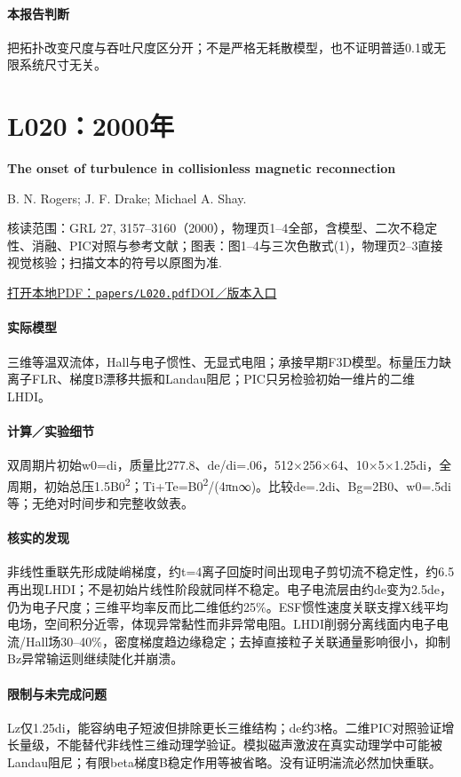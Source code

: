 \paragraph{本报告判断}把拓扑改变尺度与吞吐尺度区分开；不是严格无耗散模型，也不证明普适0.1或无限系统尺寸无关。

\section{L020：2000年}\label{paper:L020}

\textbf{The onset of turbulence in collisionless magnetic reconnection}\citep{L020}\

B. N. Rogers;  J. F. Drake;  Michael A. Shay.

\textsf{核读范围：}GRL 27, 3157–3160（2000），物理页1–4全部，含模型、二次不稳定性、消融、PIC对照与参考文献；\textsf{图表：}图1–4与三次色散式(1)，物理页2–3直接视觉核验；扫描文本的符号以原图为准.

\href{run:papers/L020.pdf}{打开本地PDF：\texttt{papers/L020.pdf}}\quad\href{https://doi.org/10.1029/2000gl000038}{DOI／版本入口}

\paragraph{实际模型}三维等温双流体，Hall与电子惯性、无显式电阻；承接早期F3D模型。标量压力缺离子FLR、梯度B漂移共振和Landau阻尼；PIC只另检验初始一维片的二维LHDI。

\paragraph{计算／实验细节}双周期片初始w0=di，质量比277.8、de/di=.06，512×256×64、10×5×1.25di，全周期，初始总压1.5B0\textsuperscript{2}；Ti+Te=B0\textsuperscript{2}/(4πn∞)。比较de=.2di、Bg=2B0、w0=.5di等；无绝对时间步和完整收敛表。

\paragraph{核实的发现}非线性重联先形成陡峭梯度，约t=4离子回旋时间出现电子剪切流不稳定性，约6.5再出现LHDI；不是初始片线性阶段就同样不稳定。电子电流层由约de变为2.5de，仍为电子尺度；三维平均率反而比二维低约25\%。ESF惯性速度关联支撑X线平均电场，空间积分近零，体现异常黏性而非异常电阻。LHDI削弱分离线面内电子电流/Hall场30–40\%，密度梯度趋边缘稳定；去掉直接粒子关联通量影响很小，抑制Bz异常输运则继续陡化并崩溃。

\paragraph{限制与未完成问题}Lz仅1.25di，能容纳电子短波但排除更长三维结构；de约3格。二维PIC对照验证增长量级，不能替代非线性三维动理学验证。模拟磁声激波在真实动理学中可能被Landau阻尼；有限beta梯度B稳定作用等被省略。没有证明湍流必然加快重联。

